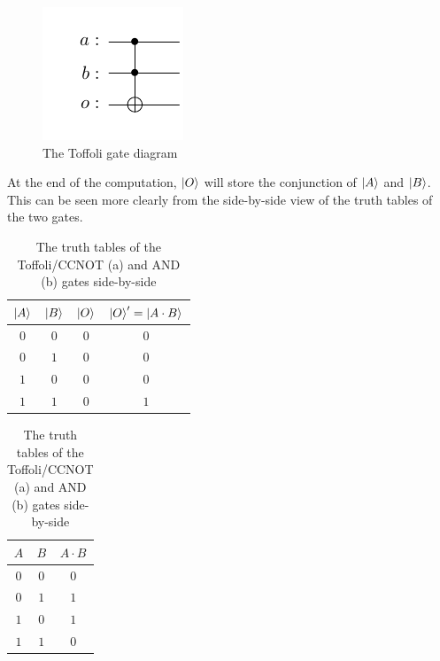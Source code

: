 \begin{figure}[!ht]
    \centering
    \includegraphics{images/5_Implementation/toffoli_gate_diagram.pdf}
    \caption{The Toffoli gate diagram}
\end{figure}

At the end of the computation, $\ket{O}$ will store the conjunction of $\ket{A}$ and $\ket{B}$. This can be seen more clearly from the side-by-side
view of the truth tables of the two gates.

\begin{table}[!ht]
    \centering
    \begin{subtable}[h]{0.45\textwidth}
        \centering
        \begin{tabular}{ccc|c}
            $\ket{A}$ & $\ket{B}$ & $\ket{O}$ & $\ket{O}'=\ket{A \cdot B}$ \\
            \hline
            $0$ & $0$ & $0$ & $0$ \\
            $0$ & $1$ & $0$ & $0$ \\
            $1$ & $0$ & $0$ & $0$ \\
            $1$ & $1$ & $0$ & $1$ \\
        \end{tabular}
        \caption{CCNOT's truth table}
    \end{subtable}
    \begin{subtable}[h]{0.45\textwidth}
        \centering
        \begin{tabular}{cc|c}
            $A$ & $B$ & $A \cdot B$ \\
            \hline
            $0$ & $0$ & $0$ \\
            $0$ & $1$ & $1$ \\
            $1$ & $0$ & $1$ \\
            $1$ & $1$ & $0$ \\
        \end{tabular}
        \caption{AND's truth table}
    \end{subtable}
    \caption{The truth tables of the Toffoli/CCNOT (a) and AND (b) gates side-by-side}
\end{table}

